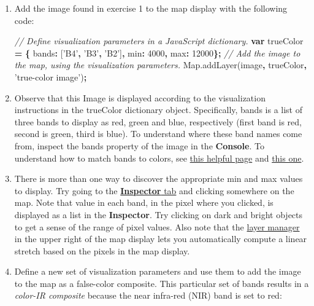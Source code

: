 \documentclass[
]{article}
\newenvironment{Shaded}{\begin{snugshade}}{\end{snugshade}}
\newcommand{\AttributeTok}[1]{\textcolor[rgb]{0.77,0.63,0.00}{#1}}
\newcommand{\CommentTok}[1]{\textcolor[rgb]{0.56,0.35,0.01}{\textit{#1}}}
\newcommand{\DataTypeTok}[1]{\textcolor[rgb]{0.13,0.29,0.53}{#1}}
\newcommand{\DecValTok}[1]{\textcolor[rgb]{0.00,0.00,0.81}{#1}}
\newcommand{\KeywordTok}[1]{\textcolor[rgb]{0.13,0.29,0.53}{\textbf{#1}}}
\newcommand{\NormalTok}[1]{#1}
\newcommand{\OperatorTok}[1]{\textcolor[rgb]{0.81,0.36,0.00}{\textbf{#1}}}
\newcommand{\StringTok}[1]{\textcolor[rgb]{0.31,0.60,0.02}{#1}}
\newcommand{\VariableTok}[1]{\textcolor[rgb]{0.00,0.00,0.00}{#1}}
\begin{document}
\begin{enumerate}
\def\labelenumi{\alph{enumi}.}
\item
  Add the image found in exercise 1 to the map display with the following code:

\begin{Shaded}
\begin{Highlighting}[]
\CommentTok{//  Define visualization parameters in a JavaScript dictionary.   }
\KeywordTok{var}\NormalTok{ trueColor }\OperatorTok{=} \OperatorTok{\{}    
  \DataTypeTok{bands}\OperatorTok{:}\NormalTok{ [}\StringTok{'B4'}\OperatorTok{,} \StringTok{'B3'}\OperatorTok{,} \StringTok{'B2'}\NormalTok{]}\OperatorTok{,}    
  \DataTypeTok{min}\OperatorTok{:} \DecValTok{4000}\OperatorTok{,}    
  \DataTypeTok{max}\OperatorTok{:} \DecValTok{12000}\OperatorTok{\};}  
\CommentTok{// Add the image to the  map, using the visualization parameters.   }
\VariableTok{Map}\NormalTok{.}\AttributeTok{addLayer}\NormalTok{(image}\OperatorTok{,}\NormalTok{ trueColor}\OperatorTok{,} \StringTok{'true-color image'}\NormalTok{)}\OperatorTok{;}  
\end{Highlighting}
\end{Shaded}
\item
  Observe that this Image is displayed according to the visualization instructions in the trueColor dictionary object. Specifically, bands is a list of three bands to display as red, green and blue, respectively (first band is red, second is green, third is blue). To understand where these band names come from, inspect the bands property of the image in the \textbf{Console}. To understand how to match bands to colors, see \href{http://landsat.usgs.gov/band_designations_landsat_satellites.php}{this helpful page} and \href{http://landsat.usgs.gov/L8_band_combos.php}{this one}.
\item
  There is more than one way to discover the appropriate min and max values to display. Try going to the \href{https://developers.google.com/earth-engine/playground\#inspector-tab}{\textbf{Inspector} tab} and clicking somewhere on the map. Note that value in each band, in the pixel where you clicked, is displayed as a list in the \textbf{Inspector}. Try clicking on dark and bright objects to get a sense of the range of pixel values. Also note that the \href{https://developers.google.com/earth-engine/playground\#layer-manager}{layer manager} in the upper right of the map display lets you automatically compute a linear stretch based on the pixels in the map display.
\item
  Define a new set of visualization parameters and use them to add the image to the map as a false-color composite. This particular set of bands results in a \emph{color-IR composite} because the near infra-red (NIR) band is set to red:


\end{enumerate}
\end{document}
